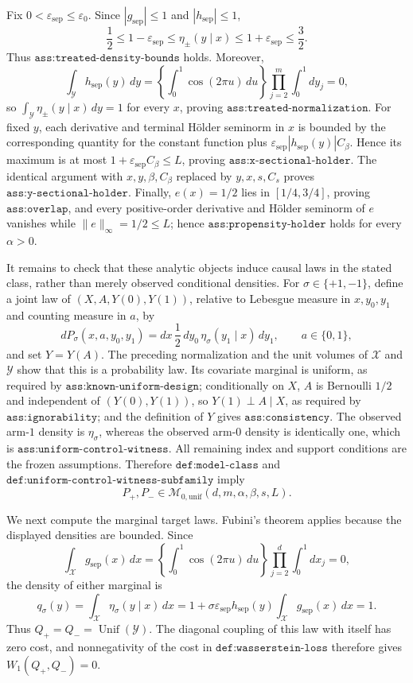 Fix \(0<\varepsilon_{\mathrm{sep}}\le\varepsilon_0\).  Since \(|g_{\mathrm{sep}}|\le1\) and \(|h_{\mathrm{sep}}|\le1\),
\[
\frac12\le 1-\varepsilon_{\mathrm{sep}}
 \le \eta_\pm(y\mid x)
 \le 1+\varepsilon_{\mathrm{sep}}\le\frac32.
\]
Thus \(\texttt{ass:treated-density-bounds}\) holds.  Moreover,
\[
\int_{\mathcal Y}h_{\mathrm{sep}}(y)\,dy
=\left\{\int_0^1\cos(2\pi u)\,du\right\}
 \prod_{j=2}^m\int_0^1dy_j=0,
\]
so \(\int_{\mathcal Y}\eta_\pm(y\mid x)\,dy=1\) for every \(x\), proving \(\texttt{ass:treated-normalization}\).  For fixed \(y\), each derivative and terminal H\"older seminorm in \(x\) is bounded by the corresponding quantity for the constant function plus \(\varepsilon_{\mathrm{sep}}|h_{\mathrm{sep}}(y)|C_\beta\).  Hence its maximum is at most \(1+\varepsilon_{\mathrm{sep}}C_\beta\le L\), proving \(\texttt{ass:x-sectional-holder}\).  The identical argument with \(x,y,\beta,C_\beta\) replaced by \(y,x,s,C_s\) proves \(\texttt{ass:y-sectional-holder}\).  Finally, \(e(x)=1/2\) lies in \([1/4,3/4]\), proving \(\texttt{ass:overlap}\), and every positive-order derivative and H\"older seminorm of \(e\) vanishes while \(\|e\|_\infty=1/2\le L\); hence \(\texttt{ass:propensity-holder}\) holds for every \(\alpha>0\).

It remains to check that these analytic objects induce causal laws in the stated class, rather than merely observed conditional densities.  For \(\sigma\in\{+1,-1\}\), define a joint law of \((X,A,Y(0),Y(1))\), relative to Lebesgue measure in \(x,y_0,y_1\) and counting measure in \(a\), by
\[
dP_\sigma(x,a,y_0,y_1)
=dx\,\frac12\,dy_0\,\eta_\sigma(y_1\mid x)\,dy_1,
\qquad a\in\{0,1\},
\]
and set \(Y=Y(A)\).  The preceding normalization and the unit volumes of \(\mathcal X\) and \(\mathcal Y\) show that this is a probability law.  Its covariate marginal is uniform, as required by \(\texttt{ass:known-uniform-design}\); conditionally on \(X\), \(A\) is Bernoulli \(1/2\) and independent of \((Y(0),Y(1))\), so \(Y(1)\perp A\mid X\), as required by \(\texttt{ass:ignorability}\); and the definition of \(Y\) gives \(\texttt{ass:consistency}\).  The observed arm-\(1\) density is \(\eta_\sigma\), whereas the observed arm-\(0\) density is identically one, which is \(\texttt{ass:uniform-control-witness}\).  All remaining index and support conditions are the frozen assumptions.  Therefore \(\texttt{def:model-class}\) and \(\texttt{def:uniform-control-witness-subfamily}\) imply
\[
P_+,P_-\in\mathcal M_{0,\mathrm{unif}}(d,m,\alpha,\beta,s,L).
\]

We next compute the marginal target laws.  Fubini's theorem applies because the displayed densities are bounded.  Since
\[
\int_{\mathcal X}g_{\mathrm{sep}}(x)\,dx
=\left\{\int_0^1\cos(2\pi u)\,du\right\}
 \prod_{j=2}^d\int_0^1dx_j=0,
\]
the density of either marginal is
\[
q_\sigma(y)=\int_{\mathcal X}\eta_\sigma(y\mid x)\,dx
=1+\sigma\varepsilon_{\mathrm{sep}}h_{\mathrm{sep}}(y)
 \int_{\mathcal X}g_{\mathrm{sep}}(x)\,dx=1.
\]
Thus \(Q_+=Q_-=\operatorname{Unif}(\mathcal Y)\).  The diagonal coupling of this law with itself has zero cost, and nonnegativity of the cost in \(\texttt{def:wasserstein-loss}\) therefore gives \(W_1(Q_+,Q_-)=0\).

